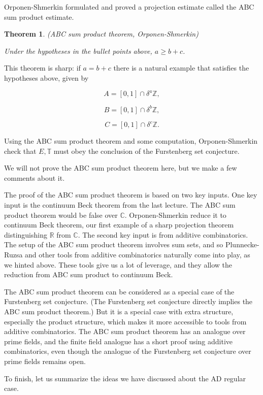 \documentclass[12pt]{amsart}
\newtheorem{theorem}{Theorem}[section]
\newcommand{\CC}{\mathbb{C}}
\newcommand{\ZZ}{\mathbb{Z}}
\newcommand{\RR}{\mathbb{R}}
\newcommand{\TT}{\mathbb{T}}
\begin{document}
Orponen-Shmerkin formulated and proved a projection estimate called the ABC sum product estimate.

\begin{theorem} \label{thmabc} (ABC sum product theorem,  Orponen-Shmerkin) 

Under the hypotheses in the bullet points above,  $a \ge b + c$.  

\end{theorem}

 This theorem is sharp: if $a = b +c$ there is a natural example that satisfies the hypotheses above,  given by

$$A = [0,1] \cap \delta^a \ZZ, $$

$$B = [0,1] \cap \delta^b \ZZ, $$

$$ C = [0,1] \cap \delta^c \ZZ.$$

Using the ABC sum product theorem and some computation,  Orponen-Shmerkin check that $E, \TT$ must obey the conclusion of the Furstenberg set conjecture.

We will not prove the ABC sum product theorem here,  but we make a few comments about it.

The proof of the ABC sum product theorem is based on two key inputs.  One key input is the continuum Beck theorem from the last lecture.   The ABC sum product theorem would be false over $\CC$.    Orponen-Shmerkin reduce it to continuum Beck theorem,  our first example of a sharp projection theorem distinguishing $\RR$ from $\CC$.    The second key input is from additive combinatorics.   The setup of the ABC sum product theorem involves sum sets,  and so Plunnecke-Ruzsa and other tools from additive combinatorics naturally come into play,  as we hinted above.   These tools give us a lot of leverage,  and they allow the reduction from ABC sum product to continuum Beck.

The ABC sum product theorem can be considered as a special case of the Furstenberg set conjecture.   (The Furstenberg set conjecture directly implies the ABC sum product theorem.)   But it is a special case with extra structure,  especially the product structure,  which makes it more accessible to tools from additive combinatorics.   The ABC sum product theorem has an analogue over prime fields,  and the finite field analogue has a short proof using additive combinatorics,  even though the analogue of the Furstenberg set conjecture over prime fields remains open. 

To finish,  let us summarize the ideas we have discussed about the AD regular case.   
\end{document}
